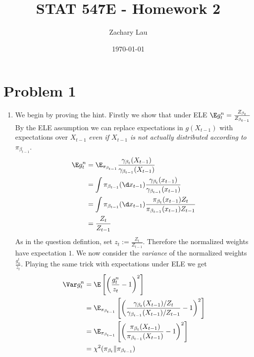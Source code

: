 \documentclass{article}
\begin{document}
\title{STAT 547E - Homework 2}
\author{Zachary Lau}
\date{\today}
\maketitle

\section{Problem 1}
\begin{enumerate}
    \item %
    We begin by proving the hint. Firstly we show that under ELE
    $\E g^n_t = \frac {Z_{\beta_t}}{Z_{\beta_{t-1}}}$
    By the ELE assumption we can replace expectations in
    $g(X_{t-1})$ with expectations over $X_{t-1}$ \emph{even if $X_{t-1}$ is not
    actually distributed according to $\pi_{\beta_{t-1}}$}.
    \begin{align}
        \E g^n_t &= \E_{\pi_{\beta_{t-1}}}
            \frac{\gamma_{\beta_{t}}(X_{t-1})}{\gamma_{\beta_{t-1}}(X_{t-1})} \\
        &= \int \pi_{\beta_{t-1}}(\d x_{t-1})
            \frac{\gamma_{\beta_{t}}(x_{t-1})}{\gamma_{\beta_{t-1}}(x_{t-1})} \\
        &= \int \pi_{\beta_{t-1}}(\d x_{t-1})
            \frac{\pi_{\beta_{t}}(x_{t-1}) Z_t}{\pi_{\beta_{t-1}}(x_{t-1}) Z_{t-1}} \\ 
        &= \frac{Z_t}{Z_{t-1}} 
    \end{align}
    As in the question defintion, set $z_t := \frac{Z_t}{Z_{t-1}}$. 
    Therefore the normalized weights have expectation $1$.
    We now consider the \emph{variance} of the normalized weights $\frac{g_n^t}{z_t}$.
    Playing the same trick with expectations under ELE we get
    \begin{align}
        \Var g^n_t &= \E \left[ \left(\frac{g^n_t}{z_t} - 1\right)^2 \right] \\
        &= \E_{\pi_{\beta_{t-1}}}
        \left[ \left(\frac{\gamma_{\beta_{t}}(X_{t-1})/Z_t}
        {\gamma_{\beta_{t-1}}(X_{t-1})/Z_{t-1}} - 1\right)^2 \right] \\
        &=  \E_{\pi_{\beta_{t-1}}}
        \left[ \left(\frac{\pi_{\beta_{t}}(X_{t-1})}
        {\pi_{\beta_{t-1}}(X_{t-1})} - 1\right)^2 \right] \\
        &= \chi^2(\pi_{\beta_t} \| \pi_{\beta_{t-1}})
    \end{align}

    \newcommand{\AIS}{{\text{AIS}}}


\end{enumerate}
\end{document}
